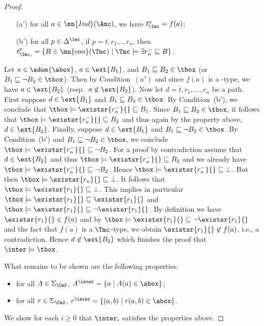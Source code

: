 \documentclass{lmcs}
\theoremstyle{definition}
\begin{document}
\begin{proof}
\begin{enumerate}
    \item[(a$'$)] for all $a \in \mn{Ind}(\Amc)$, we have $t^a_{\Imc} =
      f(a)$;

    \item[(b$'$)] for all $p \in \Delta^{\Imc}$, if $p=t,r_1 \dots, r_n$, then
      $t^p_{\Imc_i} =\{ B \in \mn{con}(\Tmc) \mid \Tmc \models
      \exists r_n^- \sqsubseteq B \}$.

    \end{enumerate}
    Let $a\in\adom{\abox}$, $a\in\ext{B_1}$, and $B_1\sqsubseteq
    B_2\in\tbox$ (or $B_1\sqsubseteq\neg B_2\in\tbox$). Then by
    Condition~$(a')$ and since $f(a)$ is a \Tmc-type, we have
    $a\in\ext{B_2}$ (resp.\ $a\not\in\ext{B_2}$). Now let
    $d=t,r_1,\ldots,r_n$ be a path. First suppose $d\in\ext{B_1}$ and
    $B_1\sqsubseteq B_2\in\tbox$. By Condition~(b$'$), we conclude that
    $\tbox\models\existsr{r_n^-}{}\sqsubseteq B_1$. Since
    $B_1\sqsubseteq B_2\in\tbox$, it follows that
    $\tbox\models\existsr{r_n^-}{}\sqsubseteq B_2$ and thus again by
    the property above, $d\in\ext{B_2}$. Finally, suppose
    $d\in\ext{B_1}$ and $B_1\sqsubseteq \neg B_2\in\tbox$. By
    Condition~(b$'$) and $B_1\sqsubseteq \neg B_2\in\tbox$, we conclude
    $\tbox\models\existsr{r_n^-}{}\sqsubseteq \neg B_2$. For a proof
    by contradiction assume that $d\in\ext{B_2}$ and thus
    $\tbox\models\existsr{r_n^-}{}\sqsubseteq B_2$ and we already have
    $\tbox\models\existsr{r_n^-}{}\sqsubseteq \neg B_2$. Hence
    $\tbox\models\existsr{r^-_n}{}\sqsubseteq \bot$. But then
    $\tbox\models \existsr{r_n}{}\sqsubseteq \bot$. It follows that
    $\tbox\models\existsr{r_1}{}\sqsubseteq\bot$. This implies in
    particular $\tbox\models\existsr{r_1}{}\sqsubseteq\existsr{r_1}{}$
    and
    $\tbox\models\existsr{r_1}{}\sqsubseteq\neg\existsr{r_1}{}$. By
    definition we have $\existsr{r_1}{}\in f(a)$ and by
    $\tbox\models\existsr{r_1}{}\sqsubseteq\neg\existsr{r_1}{}$ and
    the fact that $f(a)$ is a $\Tmc$-type, we obtain
    $\existsr{r_1}{}\not\in f(a)$, i.e., a contradiction. Hence
    $d\not\in\ext{B_2}$ which finishes the proof that
    $\inter\models\tbox$.
    
    What remains to be shown are the following properties:
    \begin{itemize}
    \item for all $A\in\Sigma_{\Csf}$, $A^\inter=\{a\mid A(a)\in\abox\}$;
    \item for all $r\in\Sigma_{\Csf}$, $r^\inter=\{(a,b)\mid
      r(a,b)\in\abox\}$.
    \end{itemize}
    We show for each $i\geq 0$ that $\inter_i$ satisfies the
    properties above.


\end{proof}
\end{document}
